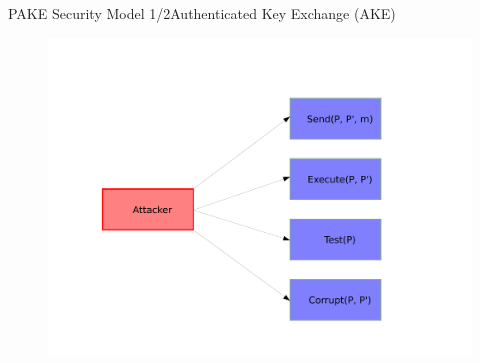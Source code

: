 \documentclass[notes,xcolor=dvipsnames]{beamer}
\begin{document}
\begin{frame}{PAKE Security Model 1/2}{Authenticated Key Exchange (AKE)}
  \begin{figure}
  \centering
  \includegraphics[width=\textwidth]{pakeGame.pdf}
  \end{figure}
\end{frame}
\end{document}
